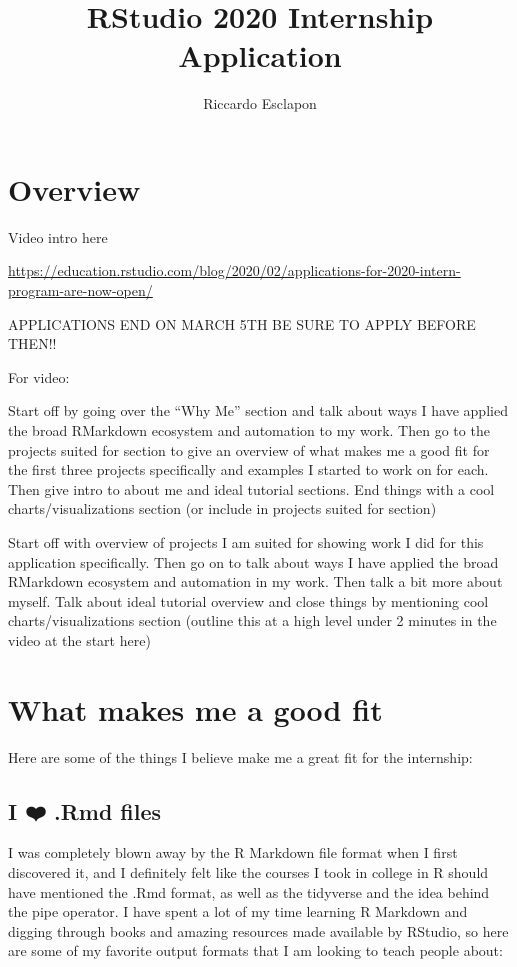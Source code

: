 \documentclass[
]{book}
\title{RStudio 2020 Internship Application}
\author{Riccardo Esclapon}
\date{}
\begin{document}
\maketitle

{
\setcounter{tocdepth}{1}
\tableofcontents
}
\hypertarget{overview}{%
\chapter{Overview}\label{overview}}

Video intro here

\url{https://education.rstudio.com/blog/2020/02/applications-for-2020-intern-program-are-now-open/}

APPLICATIONS END ON MARCH 5TH BE SURE TO APPLY BEFORE THEN!!

For video:

Start off by going over the ``Why Me'' section and talk about ways I have applied the broad RMarkdown ecosystem and automation to my work. Then go to the projects suited for section to give an overview of what makes me a good fit for the first three projects specifically and examples I started to work on for each. Then give intro to about me and ideal tutorial sections. End things with a cool charts/visualizations section (or include in projects suited for section)

Start off with overview of projects I am suited for showing work I did for this application specifically. Then go on to talk about ways I have applied the broad RMarkdown ecosystem and automation in my work. Then talk a bit more about myself. Talk about ideal tutorial overview and close things by mentioning cool charts/visualizations section (outline this at a high level under 2 minutes in the video at the start here)

\hypertarget{fit}{%
\chapter{What makes me a good fit}\label{fit}}

Here are some of the things I believe make me a great fit for the internship:

\hypertarget{i-uxfe0f-.rmd-files}{%
\section{I ❤️ .Rmd files}\label{i-uxfe0f-.rmd-files}}

I was completely blown away by the R Markdown file format when I first discovered it, and I definitely felt like the courses I took in college in R should have mentioned the .Rmd format, as well as the tidyverse and the idea behind the pipe operator. I have spent a lot of my time learning R Markdown and digging through books and amazing resources made available by RStudio, so here are some of my favorite output formats that I am looking to teach people about:
\end{document}
